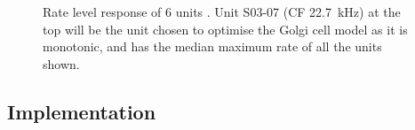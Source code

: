  \begin{figure}[htp!]
   \centering
  \caption{Rate level response of 6 units \citep[from Fig.~2]{GhoshalKim:1997}. Unit S03-07 (CF 22.7~kHz) at the top will be the unit chosen to optimise the Golgi cell model as it is monotonic, and has the median maximum rate of all the units shown.}\label{fig:GolgiKimFig2}
\end{figure}

\subsection{Implementation}

